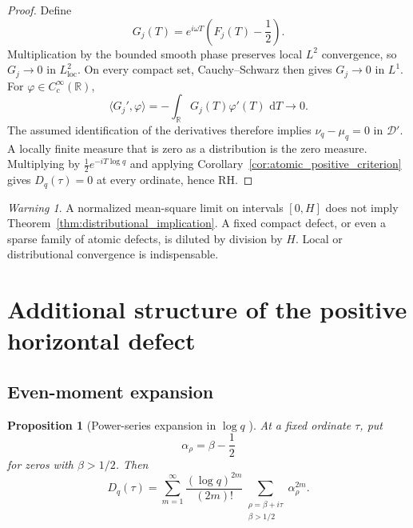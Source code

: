 \documentclass[11pt]{amsart}
\numberwithin{equation}{section}
\theoremstyle{plain}
\newtheorem{proposition}[theorem]{Proposition}
\theoremstyle{definition}
\theoremstyle{remark}
\newtheorem{warning}[theorem]{Warning}
\newcommand{\RH}{\mathrm{RH}}
\newcommand{\1}{\mathbf{1}}
\newcommand{\dd}{\,\mathrm{d}}
\begin{document}
\begin{proof}
Define
\begin{equation}
G_j(T)
=
e^{i\omega T}\left(F_j(T)-\frac12\right).
\label{eq:distributional_Gj_detailed}
\end{equation}
Multiplication by the bounded smooth phase preserves local \(L^2\)
convergence, so \(G_j\to0\) in \(L^2_{\mathrm{loc}}\).  On every compact
set, Cauchy--Schwarz then gives \(G_j\to0\) in \(L^1\).  For
\(\varphi\in C_c^\infty(\mathbb R)\),
\begin{equation}
\langle G_j',\varphi\rangle
=
-\int_{\mathbb R}G_j(T)\varphi'(T)\,\dd T
\longrightarrow0.
\label{eq:distributional_derivative_limit_detailed}
\end{equation}
The assumed identification of the derivatives therefore implies
\(\nu_q-\mu_q=0\) in \(\mathcal D'\).  A locally finite measure that is
zero as a distribution is the zero measure.  Multiplying by
\(\frac12e^{-iT\log q}\) and applying
Corollary~\ref{cor:atomic_positive_criterion} gives
\(D_q(\tau)=0\) at every ordinate, hence \(\RH\).
\end{proof}

\begin{warning}
\label{warn:global_mean_not_local}
A normalized mean-square limit on intervals \([0,H]\) does not imply
Theorem~\ref{thm:distributional_implication}.  A fixed compact defect, or
even a sparse family of atomic defects, is diluted by division by \(H\).
Local or distributional convergence is indispensable.
\end{warning}


\section{Additional structure of the positive horizontal defect}
\label{sec:additional_positive_defect}

\subsection{Even-moment expansion}
\label{subsec:even_moment_expansion}


\begin{proposition}[Power-series expansion in \(\log q\) {}]
\label{prop:Dq_power_series}
At a fixed ordinate $\tau$, put
\begin{equation}
\alpha_\rho=\beta-\frac12
\label{eq:alpha_rho_local_definition}
\end{equation}
for zeros with $\beta>1/2$.  Then
\begin{equation}
D_q(\tau)
=
\sum_{m=1}^{\infty}
\frac{(\log q)^{2m}}{(2m)!}
\sum_{\substack{\rho=\beta+i\tau\\\beta>1/2}}
\alpha_\rho^{2m}.
\label{eq:Dq_even_moments}
\end{equation}
\end{proposition}
\end{document}
